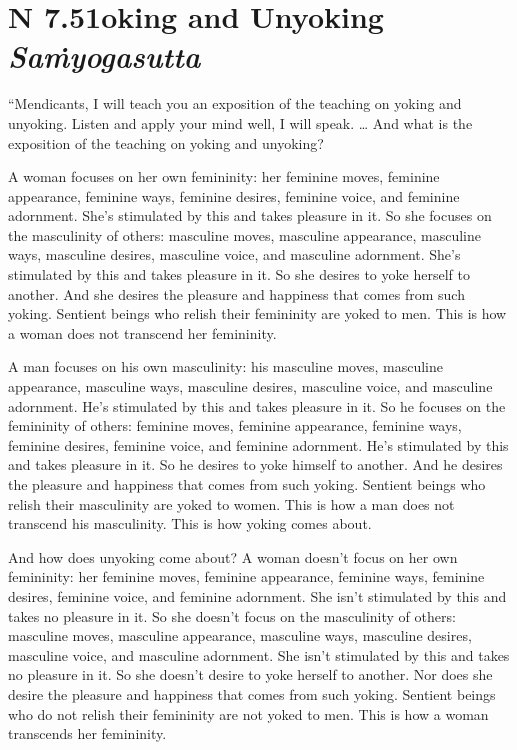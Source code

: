 \documentclass[12pt,openany]{book}%
\newcommand*{\suttatitleacronym}[1]{\smaller[2]{#1}\vspace*{.3em}}
\newcommand*{\suttatitletranslation}[1]{\linebreak{#1}}
\newcommand*{\suttatitleroot}[1]{\linebreak\smaller[2]\itshape{#1}}
\newcommand*{\tocacronym}[1]{\hspace*{-3.3em}{#1}\quad}
\newcommand*{\toctranslation}[1]{#1}
\newcommand*{\tocroot}[1]{(\textit{#1})}
\begin{document}
%
\section*{{\suttatitleacronym AN 7.51}{\suttatitletranslation Yoking and Unyoking }{\suttatitleroot Saṁyogasutta}}
\addcontentsline{toc}{section}{\tocacronym{AN 7.51} \toctranslation{Yoking and Unyoking } \tocroot{Saṁyogasutta}}

“Mendicants, I will teach you an exposition of the teaching on yoking and unyoking. Listen and apply your mind well, I will speak. … And what is the exposition of the teaching on yoking and unyoking? 

A woman focuses on her own femininity: her feminine moves, feminine appearance, feminine ways, feminine desires, feminine voice, and feminine adornment. She’s stimulated by this and takes pleasure in it. So she focuses on the masculinity of others: masculine moves, masculine appearance, masculine ways, masculine desires, masculine voice, and masculine adornment. She’s stimulated by this and takes pleasure in it. So she desires to yoke herself to another. And she desires the pleasure and happiness that comes from such yoking. Sentient beings who relish their femininity are yoked to men. This is how a woman does not transcend her femininity. 

A man focuses on his own masculinity: his masculine moves, masculine appearance, masculine ways, masculine desires, masculine voice, and masculine adornment. He’s stimulated by this and takes pleasure in it. So he focuses on the femininity of others: feminine moves, feminine appearance, feminine ways, feminine desires, feminine voice, and feminine adornment. He’s stimulated by this and takes pleasure in it. So he desires to yoke himself to another. And he desires the pleasure and happiness that comes from such yoking. Sentient beings who relish their masculinity are yoked to women. This is how a man does not transcend his masculinity. This is how yoking comes about. 

And how does unyoking come about? A woman doesn’t focus on her own femininity: her feminine moves, feminine appearance, feminine ways, feminine desires, feminine voice, and feminine adornment. She isn’t stimulated by this and takes no pleasure in it. So she doesn’t focus on the masculinity of others: masculine moves, masculine appearance, masculine ways, masculine desires, masculine voice, and masculine adornment. She isn’t stimulated by this and takes no pleasure in it. So she doesn’t desire to yoke herself to another. Nor does she desire the pleasure and happiness that comes from such yoking. Sentient beings who do not relish their femininity are not yoked to men. This is how a woman transcends her femininity. 
\end{document}

